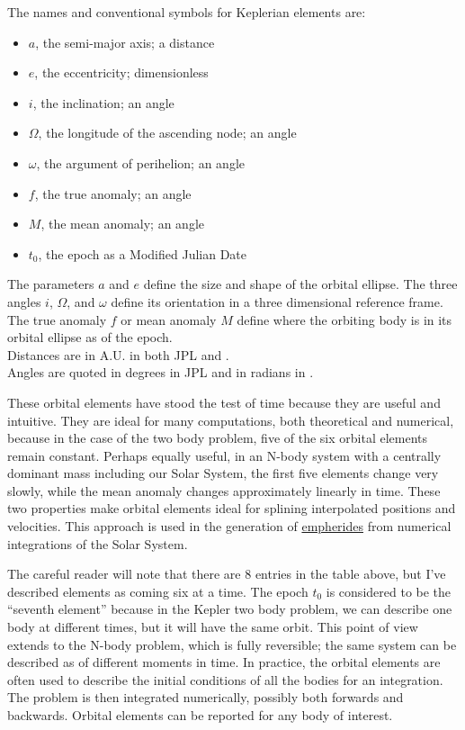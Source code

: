 \begin{samepage}
The names and conventional symbols for Keplerian elements are:
\begin{itemize}
\item $a$, the semi-major axis; a distance
\item $e$, the eccentricity; dimensionless
\item $i$, the inclination; an angle
\item $\Omega$, the longitude of the ascending node; an angle
\item $\omega$, the argument of perihelion; an angle
\item $f$, the true anomaly; an angle
\item $M$, the mean anomaly; an angle
\item $t_0$, the epoch as a Modified Julian Date
\end{itemize}
\end{samepage}
The parameters $a$ and $e$ define the size and shape of the orbital ellipse.
The three angles $i$, $\Omega$, and $\omega$ define its orientation in a three dimensional reference frame.
The true anomaly $f$ or mean anomaly $M$ define where the orbiting body is in its orbital ellipse as of the epoch.\\
Distances are in A.U. in both JPL and .  \\
Angles are quoted in degrees in JPL and in radians in .

These orbital elements have stood the test of time because they are useful and intuitive.
They are ideal for many computations, both theoretical and numerical, because in the case of the two body problem, five of the six orbital elements remain constant.
Perhaps equally useful, in an N-body system with a centrally dominant mass including our Solar System,
the first five elements change very slowly, while the mean anomaly changes approximately linearly in time.
These two properties make orbital elements ideal for splining interpolated positions and velocities.
This approach is used in the generation of \href{https://en.wikipedia.org/wiki/Ephemeris}{empherides} from numerical integrations of the Solar System.

The careful reader will note that there are 8 entries in the table above, but I've described elements as coming six at a time.
The epoch $t_0$ is considered to be the ``seventh element'' because in the Kepler two body problem, we can describe one body at different times, but it will have the same orbit.
This point of view extends to the N-body problem, which is fully reversible; the same system can be described as of different moments in time.
In practice, the orbital elements are often used to describe the initial conditions of all the bodies for an integration.
The problem is then integrated numerically, possibly both forwards and backwards.
Orbital elements can be reported for any body of interest.

